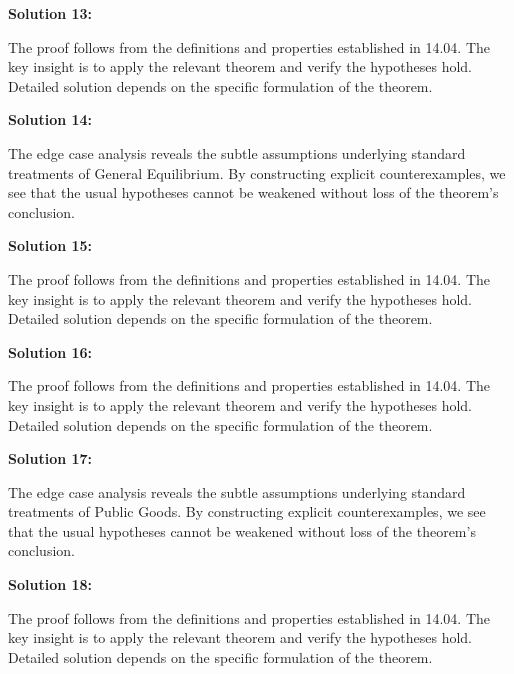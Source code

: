 \documentclass[12pt,a4paper]{exam}
\begin{document}
\vspace{0.5cm}

\textbf{Solution 13:}

The proof follows from the definitions and properties established in 14.04. The key insight is to apply the relevant theorem and verify the hypotheses hold. Detailed solution depends on the specific formulation of the theorem.

\vspace{0.5cm}

\textbf{Solution 14:}

The edge case analysis reveals the subtle assumptions underlying standard treatments of General Equilibrium. By constructing explicit counterexamples, we see that the usual hypotheses cannot be weakened without loss of the theorem's conclusion.

\vspace{0.5cm}

\textbf{Solution 15:}

The proof follows from the definitions and properties established in 14.04. The key insight is to apply the relevant theorem and verify the hypotheses hold. Detailed solution depends on the specific formulation of the theorem.

\vspace{0.5cm}

\textbf{Solution 16:}

The proof follows from the definitions and properties established in 14.04. The key insight is to apply the relevant theorem and verify the hypotheses hold. Detailed solution depends on the specific formulation of the theorem.

\vspace{0.5cm}

\textbf{Solution 17:}

The edge case analysis reveals the subtle assumptions underlying standard treatments of Public Goods. By constructing explicit counterexamples, we see that the usual hypotheses cannot be weakened without loss of the theorem's conclusion.

\vspace{0.5cm}

\textbf{Solution 18:}

The proof follows from the definitions and properties established in 14.04. The key insight is to apply the relevant theorem and verify the hypotheses hold. Detailed solution depends on the specific formulation of the theorem.

\vspace{0.5cm}
\end{document}
